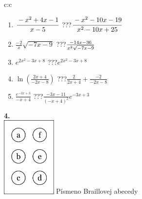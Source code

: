 \documentclass[10pt]{report}
\begin{document}
\begin{tabular}{c:c}
\begin{minipage}[c][104.5mm][t]{0.5\linewidth}
\begin{center}
\begin{minipage}{0.79\linewidth}
\begin{center}
\begin{varwidth}{\linewidth}
\begin{enumerate}
\item $\cfrac{-x^2+4x-1}{x-5}$\quad \dotfill\; ???\;\dotfill \quad $\cfrac{-x^2-10x-19}{x^2-10x+25}$
\item $\frac{-2}{x}\sqrt{-7x-9}$\quad \dotfill\; ???\;\dotfill \quad $\frac{-14x-36}{x^2 \sqrt{\smash[b]{-7x-9}}}$
\item $e^{2x^2-3x+8}$\quad \dotfill\; ???\;\dotfill \quad $e^{2x^2-3x+8}$
\item $\ln{\left(\frac{2x+4}{-2x-8}\right)}$\quad \dotfill\; ???\;\dotfill \quad $\frac{2}{2x+4}+\frac{-2}{-2x-8}$
\item $\frac{e^{-3x+3}}{-x+4}$\quad \dotfill\; ???\;\dotfill \quad $\frac{-3x-11}{(-x+4)^2}e^{-3x+3}$
\end{enumerate}
\end{varwidth}
\end{center}
\end{minipage}
\begin{minipage}{0.20\linewidth}
\begin{center}
{\Huge\bfseries 4.} \\[2mm]
\includegraphics[height=40mm]{../images/braille.png}
{\small Písmeno Braillovej abecedy}
\end{center}
\end{minipage}
\end{center}
\end{minipage}
%
\end{tabular}
\newpage
\thispagestyle{empty}
\end{document}

